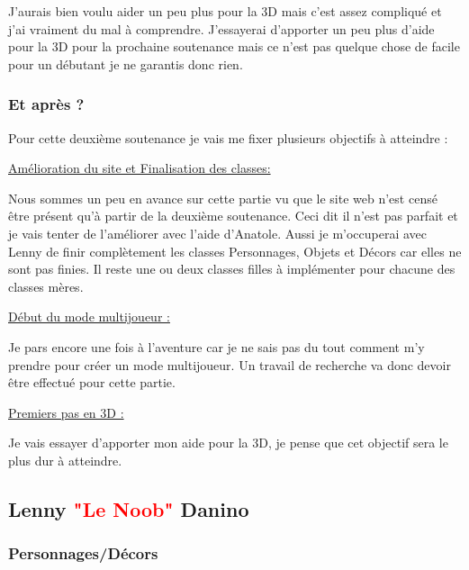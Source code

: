 \documentclass{article}
\begin{document}
\par
J'aurais bien voulu aider un peu plus pour la 3D mais c'est assez compliqué et j'ai vraiment du mal à comprendre. J'essayerai d'apporter un peu plus d'aide pour la 3D pour la prochaine soutenance mais ce n'est pas quelque chose de facile pour un débutant je ne garantis donc rien.
\newline

\subsubsection{Et après ?}
\par
Pour cette deuxième soutenance je vais me fixer plusieurs objectifs à atteindre :
\newline

\par
\underline{Amélioration du site et Finalisation des classes:}
\newline
\par
Nous sommes un peu en avance sur cette partie vu que le site web n'est censé être présent qu'à partir de la deuxième soutenance. Ceci dit il n'est pas parfait et je vais tenter de l'améliorer avec l'aide d'Anatole.
Aussi je m'occuperai avec Lenny de finir complètement les classes Personnages, Objets et Décors car elles ne sont pas finies. Il reste une ou deux classes filles à implémenter pour chacune des classes mères.
\newline

\par
\underline{Début du mode multijoueur :}
\newline
\par
Je pars encore une fois à l'aventure car je ne sais pas du tout comment m'y prendre pour créer un mode multijoueur. Un travail de recherche va donc devoir être effectué pour cette partie.
\newline

\par
\underline{Premiers pas en 3D :}
\par
Je vais essayer d'apporter mon aide pour la 3D, je pense que cet objectif sera le plus dur à atteindre.

\newpage

\subsection{Lenny \textcolor{red}{"Le Noob"} Danino}
\subsubsection{Personnages/Décors}
\end{document}
